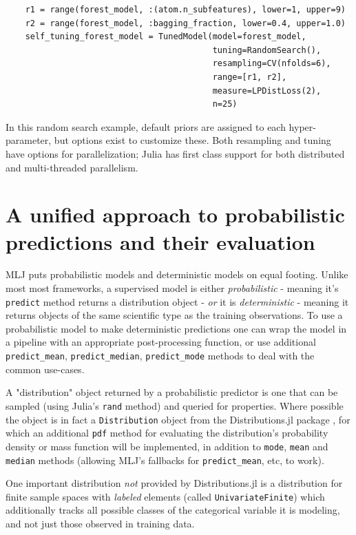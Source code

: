 \documentclass{article}
\begin{document}
\begin{verbatim}
    r1 = range(forest_model, :(atom.n_subfeatures), lower=1, upper=9)
    r2 = range(forest_model, :bagging_fraction, lower=0.4, upper=1.0)
    self_tuning_forest_model = TunedModel(model=forest_model,
                                          tuning=RandomSearch(),
                                          resampling=CV(nfolds=6),
                                          range=[r1, r2],
                                          measure=LPDistLoss(2),
                                          n=25)
\end{verbatim}

In this random search example, default priors are assigned to each
hyper-parameter, but options exist to customize these. Both resampling
and tuning have options for parallelization; Julia has first class
support for both distributed and multi-threaded parallelism.

\section{A unified approach to probabilistic predictions and their
  evaluation}

MLJ puts probabilistic models and deterministic models on equal
footing. Unlike most most frameworks, a supervised model is either
\textit{probabilistic} - meaning it's \texttt{predict} method returns a
distribution object - \textit{or} it is \textit{deterministic} -
meaning it returns objects of the same scientific type as the training
observations. To use a probabilistic model to make deterministic
predictions one can wrap the model in a pipeline with an appropriate
post-processing function, or use additional \texttt{predict\_mean},
\texttt{predict\_median}, \texttt{predict\_mode} methods to deal with
the common use-cases.

A "distribution" object returned by a probabilistic predictor is one
that can be sampled (using Julia's \texttt{rand} method) and queried
for properties. Where possible the object is in fact a
\texttt{Distribution} object from the Distributions.jl package
\cite{LinEtal2020}, for which an additional \texttt{pdf} method for
evaluating the distribution's probability density or mass function
will be implemented, in addition to \texttt{mode}, \texttt{mean}
and \texttt{median} methods (allowing MLJ's fallbacks for
\texttt{predict\_mean}, etc, to work).

One important distribution \textit{not} provided by Distributions.jl
is a distribution for finite sample spaces with {\em labeled} elements
(called \texttt{UnivariateFinite}) which additionally tracks all
possible classes of the categorical variable it is modeling, and not
just those observed in training data.
\end{document}
